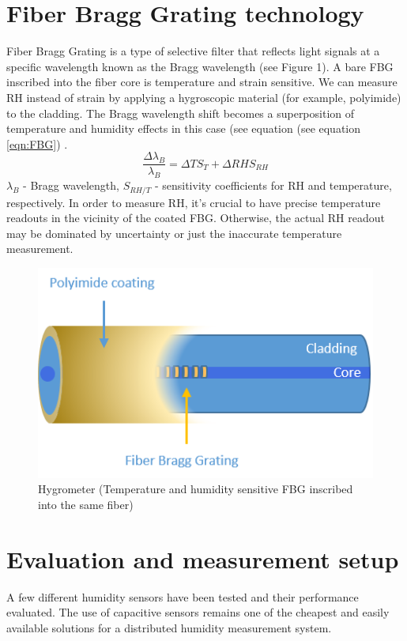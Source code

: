 \section{Fiber Bragg Grating technology}

Fiber Bragg Grating is a type of selective filter that reflects light signals at a specific wavelength known as the Bragg wavelength (see Figure 1). A bare FBG inscribed into the fiber core is temperature and strain sensitive.
We can measure RH instead of strain by applying a hygroscopic material (for example, polyimide) to the cladding. The Bragg wavelength shift becomes a superposition of temperature and humidity effects in this case (see equation (see equation \ref{eqn:FBG}) \cite{Kronenberg:02}. 
                             \begin{equation}\label{eqn:FBG}
                                    \frac{\Delta\lambda_{B}}{\lambda_{B}}=\Delta TS_{T}+\Delta RHS_{RH}
                            \end{equation}
                            $\lambda_{B}$ - Bragg wavelength, $S_{RH/T}$ - sensitivity  coefficients for RH and temperature, respectively. \newline
In order to measure RH, it’s crucial to have precise temperature readouts in the vicinity of the coated FBG. Otherwise, the actual RH readout may be dominated by uncertainty or just the inaccurate temperature measurement.

\begin{figure}[!h]
\centering
\includegraphics[width=0.4\columnwidth]{Chapter6/images/Picture1.png}
\caption{Hygrometer (Temperature and humidity sensitive FBG inscribed into the same fiber)}
\label{fig_single_photo}
\end{figure}
\section{Evaluation and measurement setup}
A few different humidity sensors have been tested and their performance evaluated. The use of capacitive sensors remains one of the cheapest and easily available solutions for a distributed humidity measurement system. 


